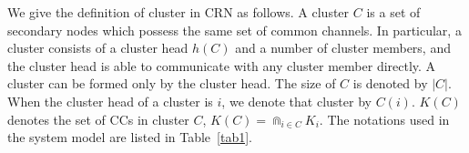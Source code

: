 \documentclass[10pt,journal,compsoc]{IEEEtran}
\theoremstyle{mytheoremstyle}
\theoremstyle{mytheoremstyle}
\theoremstyle{mytheoremstyle}
\begin{document}
We give the definition of cluster in CRN as follows. 
A cluster $C$ is a set of secondary nodes which possess the same set of common channels.
In particular, a cluster consists of a cluster head $h(C)$ and a number of cluster members, and the cluster head is able to communicate with any cluster member directly.
A cluster can be formed only by the cluster head.
The size of $C$ is denoted by $|C|$.
When the cluster head of a cluster is $i$, we denote that cluster by $C(i)$.
$K(C)$ denotes the set of CCs in cluster $C$, $ K(C) = \Cap_{i\in C} K_i$.
The notations used in the system model are listed in Table~\ref{tab1}.
\end{document}
